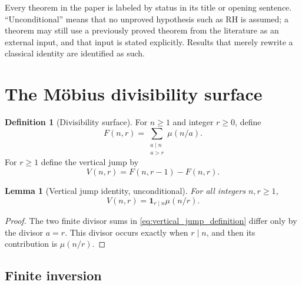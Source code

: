 \documentclass[11pt]{amsart}
\numberwithin{equation}{section}
\theoremstyle{plain}
\newtheorem{lemma}[theorem]{Lemma}
\theoremstyle{definition}
\newtheorem{definition}[theorem]{Definition}
\theoremstyle{remark}
\newcommand{\one}{\mathbf 1}
\newcommand{\mob}{\mu}
\newcommand{\Fsurf}{F}
\newcommand{\Vjump}{V}
\begin{document}
Every theorem in the paper is labeled by status in its title or opening sentence.  ``Unconditional'' means that no unproved hypothesis such as RH is assumed; a theorem may still use a previously proved theorem from the literature as an external input, and that input is stated explicitly.  Results that merely rewrite a classical identity are identified as such.

\section{The Möbius divisibility surface}
\label{sec:surface}

\begin{definition}[Divisibility surface]
\label{def:surface}
For $n\ge1$ and integer $r\ge0$, define
\begin{equation}
\Fsurf(n,r)=\sum_{\substack{a\mid n\\a>r}}\mob(n/a).
\label{eq:surface_definition}
\end{equation}
For $r\ge1$ define the vertical jump by
\begin{equation}
\Vjump(n,r)=\Fsurf(n,r-1)-\Fsurf(n,r).
\label{eq:vertical_jump_definition}
\end{equation}
\end{definition}

\begin{lemma}[Vertical jump identity, unconditional]
\label{lem:vertical_jump}
For all integers $n,r\ge1$,
\begin{equation}
\Vjump(n,r)=\one_{r\mid n}\mob(n/r).
\label{eq:vertical_jump_identity}
\end{equation}
\end{lemma}

\begin{proof}
The two finite divisor sums in \eqref{eq:vertical_jump_definition} differ only by the divisor $a=r$.  This divisor occurs exactly when $r\mid n$, and then its contribution is $\mob(n/r)$.
\end{proof}

\subsection{Finite inversion}
\label{subsec:finite_inversion}
\end{document}
